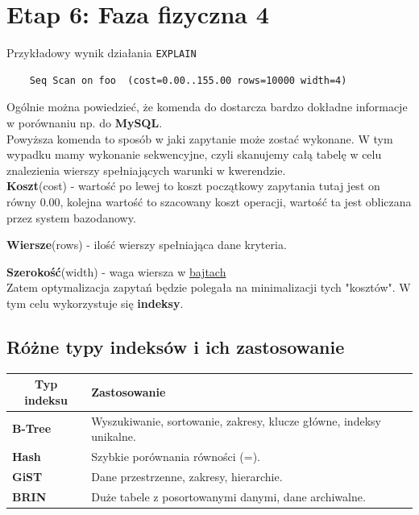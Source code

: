 \documentclass{article}
\begin{document}
\section{Etap 6: Faza fizyczna 4}

Przykładowy wynik działania \texttt{EXPLAIN}

\begin{verbatim}
    Seq Scan on foo  (cost=0.00..155.00 rows=10000 width=4)
\end{verbatim}

Ogólnie można powiedzieć, że komenda do dostarcza bardzo dokładne informacje w porównaniu np. do \textbf{MySQL}.\\

Powyższa komenda to sposób w jaki zapytanie może zostać wykonane. W tym wypadku mamy wykonanie sekwencyjne, czyli skanujemy całą tabelę w celu znalezienia wierszy spełniających warunki w kwerendzie.\\

\textbf{Koszt}(cost) - wartość po lewej to koszt początkowy zapytania tutaj jest on równy 0.00, kolejna wartość to szacowany koszt operacji, wartość ta jest obliczana przez system bazodanowy.

\textbf{Wiersze}(rows) - ilość wierszy spełniająca dane kryteria.

\textbf{Szerokość}(width) - waga wiersza w \underline{bajtach}\\

Zatem optymalizacja zapytań będzie polegała na minimalizacji tych "kosztów". W tym celu wykorzystuje się \textbf{indeksy}. \\

\subsection{Różne typy indeksów i ich zastosowanie}

\begin{table}[htbp]
\begin{tabular}{|l|l|}
\hline
\multicolumn{1}{|c|}{\textbf{Typ indeksu}} & \textbf{Zastosowanie}                                               \\ \hline
\textbf{B-Tree}                            & Wyszukiwanie, sortowanie, zakresy, klucze główne, indeksy unikalne. \\ \hline
\textbf{Hash}                              & Szybkie porównania równości (=).                                    \\ \hline
\textbf{GiST}                              & Dane przestrzenne, zakresy, hierarchie.                             \\ \hline
\textbf{BRIN}                              & Duże tabele z posortowanymi danymi, dane archiwalne.                \\ \hline
\end{tabular}
\end{table}
\end{document}
